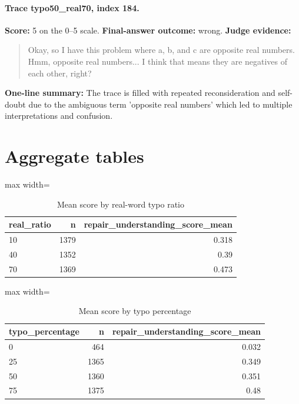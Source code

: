 \documentclass[11pt]{article}
\begin{document}
\paragraph{Trace typo50\_real70, index 184.}
\textbf{Score:} 5 on the 0--5 scale. \textbf{Final-answer outcome:} wrong.
\textbf{Judge evidence:} \begin{quote}Okay, so I have this problem where a, b, and c are opposite real numbers. Hmm, opposite real numbers... I think that means they are negatives of each other, right?\end{quote}
\textbf{One-line summary:} The trace is filled with repeated reconsideration and self-doubt due to the ambiguous term 'opposite real numbers' which led to multiple interpretations and confusion.\medskip

\section*{Aggregate tables}

\begin{table}[H]
\centering
\caption{Mean score by real-word typo ratio}
\small
\begin{adjustbox}{max width=\textwidth}
\begin{tabular}{lrr}
\toprule
\textbf{real\_ratio} & \textbf{n} & \textbf{repair\_understanding\_score\_mean} \\
\midrule
10 & 1379 & 0.318 \\
40 & 1352 & 0.39 \\
70 & 1369 & 0.473 \\
\bottomrule
\end{tabular}
\end{adjustbox}
\end{table}

\begin{table}[H]
\centering
\caption{Mean score by typo percentage}
\small
\begin{adjustbox}{max width=\textwidth}
\begin{tabular}{lrr}
\toprule
\textbf{typo\_percentage} & \textbf{n} & \textbf{repair\_understanding\_score\_mean} \\
\midrule
0 & 464 & 0.032 \\
25 & 1365 & 0.349 \\
50 & 1360 & 0.351 \\
75 & 1375 & 0.48 \\
\bottomrule
\end{tabular}
\end{adjustbox}
\end{table}
\end{document}
